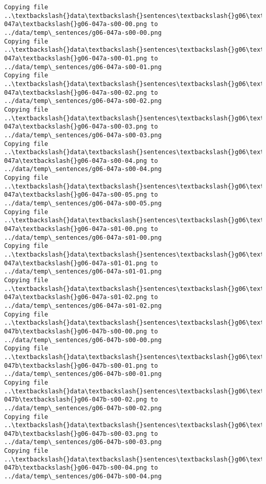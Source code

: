 \documentclass[11pt]{article}
\begin{document}
\begin{Verbatim}[commandchars=\\\{\}]
Copying file ..\textbackslash{}data\textbackslash{}sentences\textbackslash{}g06\textbackslash{}g06-047a\textbackslash{}g06-047a-s00-00.png to
../data/temp\_sentences/g06-047a-s00-00.png
Copying file ..\textbackslash{}data\textbackslash{}sentences\textbackslash{}g06\textbackslash{}g06-047a\textbackslash{}g06-047a-s00-01.png to
../data/temp\_sentences/g06-047a-s00-01.png
Copying file ..\textbackslash{}data\textbackslash{}sentences\textbackslash{}g06\textbackslash{}g06-047a\textbackslash{}g06-047a-s00-02.png to
../data/temp\_sentences/g06-047a-s00-02.png
Copying file ..\textbackslash{}data\textbackslash{}sentences\textbackslash{}g06\textbackslash{}g06-047a\textbackslash{}g06-047a-s00-03.png to
../data/temp\_sentences/g06-047a-s00-03.png
Copying file ..\textbackslash{}data\textbackslash{}sentences\textbackslash{}g06\textbackslash{}g06-047a\textbackslash{}g06-047a-s00-04.png to
../data/temp\_sentences/g06-047a-s00-04.png
Copying file ..\textbackslash{}data\textbackslash{}sentences\textbackslash{}g06\textbackslash{}g06-047a\textbackslash{}g06-047a-s00-05.png to
../data/temp\_sentences/g06-047a-s00-05.png
Copying file ..\textbackslash{}data\textbackslash{}sentences\textbackslash{}g06\textbackslash{}g06-047a\textbackslash{}g06-047a-s01-00.png to
../data/temp\_sentences/g06-047a-s01-00.png
Copying file ..\textbackslash{}data\textbackslash{}sentences\textbackslash{}g06\textbackslash{}g06-047a\textbackslash{}g06-047a-s01-01.png to
../data/temp\_sentences/g06-047a-s01-01.png
Copying file ..\textbackslash{}data\textbackslash{}sentences\textbackslash{}g06\textbackslash{}g06-047a\textbackslash{}g06-047a-s01-02.png to
../data/temp\_sentences/g06-047a-s01-02.png
Copying file ..\textbackslash{}data\textbackslash{}sentences\textbackslash{}g06\textbackslash{}g06-047b\textbackslash{}g06-047b-s00-00.png to
../data/temp\_sentences/g06-047b-s00-00.png
Copying file ..\textbackslash{}data\textbackslash{}sentences\textbackslash{}g06\textbackslash{}g06-047b\textbackslash{}g06-047b-s00-01.png to
../data/temp\_sentences/g06-047b-s00-01.png
Copying file ..\textbackslash{}data\textbackslash{}sentences\textbackslash{}g06\textbackslash{}g06-047b\textbackslash{}g06-047b-s00-02.png to
../data/temp\_sentences/g06-047b-s00-02.png
Copying file ..\textbackslash{}data\textbackslash{}sentences\textbackslash{}g06\textbackslash{}g06-047b\textbackslash{}g06-047b-s00-03.png to
../data/temp\_sentences/g06-047b-s00-03.png
Copying file ..\textbackslash{}data\textbackslash{}sentences\textbackslash{}g06\textbackslash{}g06-047b\textbackslash{}g06-047b-s00-04.png to
../data/temp\_sentences/g06-047b-s00-04.png

\end{Verbatim}
\end{document}
